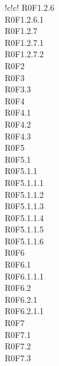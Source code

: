 \begin{tabella}{!{\VRule}c!{\VRule}c!{\VRule}}
{				R0F1.2.6 \\
				R0F1.2.6.1 \\
				R0F1.2.7 \\
				R0F1.2.7.1 \\
				R0F1.2.7.2 \\
				R0F2 \\
				R0F3 \\
				R0F3.3 \\
				R0F4 \\
				R0F4.1 \\
				R0F4.2 \\
				R0F4.3 \\
				R0F5 \\
				R0F5.1 \\
				R0F5.1.1 \\
				R0F5.1.1.1 \\
				R0F5.1.1.2 \\
				R0F5.1.1.3 \\
				R0F5.1.1.4 \\
				R0F5.1.1.5 \\
				R0F5.1.1.6 \\
				R0F6 \\
				R0F6.1 \\
				R0F6.1.1.1 \\
				R0F6.2 \\
				R0F6.2.1 \\
				R0F6.2.1.1 \\
				R0F7 \\
				R0F7.1 \\
				R0F7.2 \\
				R0F7.3 \\
			}\\ 
			

\end{tabella}
